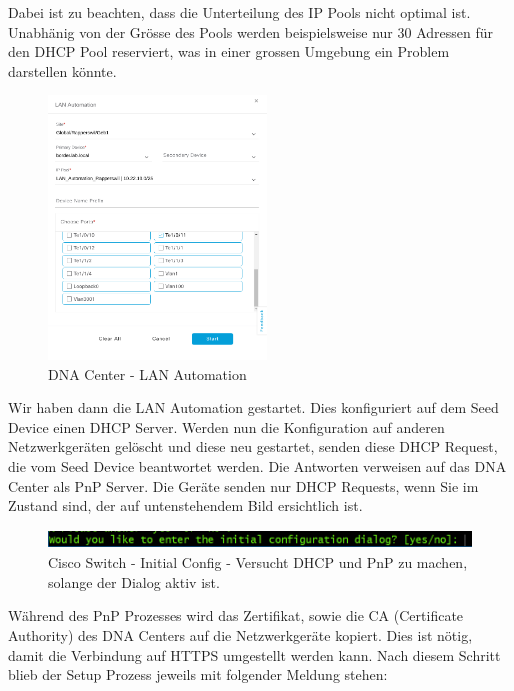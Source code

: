 Dabei ist zu beachten, dass die Unterteilung des IP Pools nicht optimal ist. Unabhänig von der Grösse des Pools werden beispielsweise nur 30 Adressen für den DHCP Pool reserviert, was in einer grossen Umgebung ein Problem darstellen könnte.

\begin{figure}[H]
	\centering
	\includegraphics[height=7cm]{img/secondtry/dna-lan-automation-dialog.png}
	\caption{DNA Center - LAN Automation}
	\label{fig:dna-lan-automation-dialog}
\end{figure}

Wir haben dann die LAN Automation gestartet. Dies konfiguriert auf dem Seed Device einen DHCP Server. Werden nun die Konfiguration auf anderen Netzwerkgeräten gelöscht und diese neu gestartet, senden diese DHCP Request, die vom Seed Device beantwortet werden. Die Antworten verweisen auf das DNA Center als PnP Server.
Die Geräte senden nur DHCP Requests, wenn Sie im Zustand sind, der auf untenstehendem Bild ersichtlich ist.

\begin{figure}[H]
	\centering
	\includegraphics[height=0.5cm]{img/secondtry/cisco-switch-initial-config.png}
	\caption{Cisco Switch - Initial Config - Versucht DHCP und PnP zu machen, solange der Dialog aktiv ist.}
	\label{fig:cisco-switch-initial-config}
\end{figure}

Während des PnP Prozesses wird das Zertifikat, sowie die CA (Certificate Authority) des DNA Centers auf die Netzwerkgeräte kopiert. Dies ist nötig, damit die Verbindung auf HTTPS umgestellt werden kann. Nach diesem Schritt blieb der Setup Prozess jeweils mit folgender Meldung stehen:

